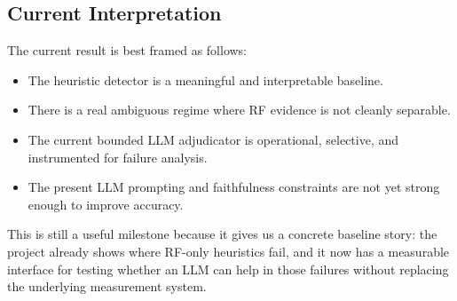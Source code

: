 \subsection{Current Interpretation}

The current result is best framed as follows:

\begin{itemize}
    \item The heuristic detector is a meaningful and interpretable baseline.
    \item There is a real ambiguous regime where RF evidence is not cleanly separable.
    \item The current bounded LLM adjudicator is operational, selective, and instrumented for failure analysis.
    \item The present LLM prompting and faithfulness constraints are not yet strong enough to improve accuracy.
\end{itemize}

This is still a useful milestone because it gives us a concrete baseline story: the project already shows where RF-only heuristics fail, and it now has a measurable interface for testing whether an LLM can help in those failures without replacing the underlying measurement system.
